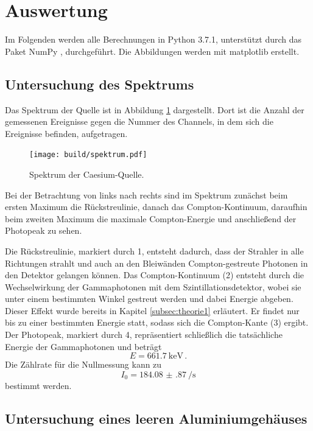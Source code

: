 \section{Auswertung}
\label{sec:Auswertung}

Im Folgenden werden alle Berechnungen in Python 3.7.1, unterstützt durch das
Paket NumPy \cite{numpy}, durchgeführt. Die Abbildungen werden mit matplotlib \cite{matplotlib} erstellt.

\subsection{Untersuchung des Spektrums}

Das Spektrum der Quelle ist in Abbildung \ref{fig:spektrum} dargestellt. Dort ist die Anzahl der gemessenen Ereignisse gegen die Nummer des Channels, in dem sich die Ereignisse befinden, aufgetragen.

\begin{figure}
  \centering
  \texttt{[image: build/spektrum.pdf]}
  \caption{Spektrum der Caesium-Quelle.}
  \label{fig:spektrum}
\end{figure}

Bei der Betrachtung von links nach rechts sind im Spektrum zunächst beim ersten
Maximum die Rückstreulinie, danach das Compton-Kontinuum, daraufhin beim zweiten
Maximum die maximale Compton-Energie und anschließend der Photopeak zu sehen.

Die Rückstreulinie, markiert durch 1, entsteht dadurch, dass der Strahler in alle Richtungen strahlt und auch an den Bleiwänden Compton-gestreute Photonen in den Detektor gelangen können. Das Compton-Kontinuum (2) entsteht durch die Wechselwirkung der Gammaphotonen mit dem Szintillationsdetektor, wobei sie unter einem bestimmten Winkel gestreut werden und dabei Energie abgeben. Dieser Effekt wurde bereits in Kapitel \ref{subsec:theorie1} erläutert. Er findet nur bis zu einer bestimmten Energie statt, sodass sich die Compton-Kante (3) ergibt.
Der Photopeak, markiert durch 4, repräsentiert schließlich die tatsächliche Energie der Gammaphotonen
und beträgt \cite{energie}
\begin{equation*}
  E=\SI{661.7}{\kilo\eV} \,.
\end{equation*}
Die Zählrate für die Nullmessung kann zu
\begin{equation*}
  I_0=\SI{184.08(87)}{\per \second}
\end{equation*}
bestimmt werden.

\subsection{Untersuchung eines leeren Aluminiumgehäuses}

